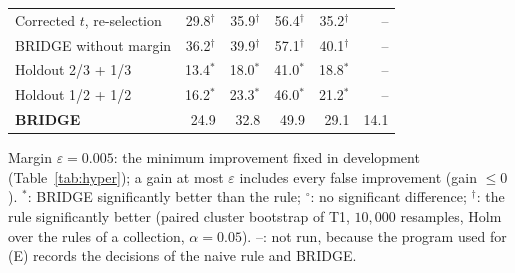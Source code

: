 \begin{table}[!t]
\begin{tabular}{@{}lrrrrr@{}}
Corrected $t$, re-selection & 29.8$^{\dagger}$ & 35.9$^{\dagger}$ & 56.4$^{\dagger}$ & 35.2$^{\dagger}$ & -- \\
BRIDGE without margin & 36.2$^{\dagger}$ & 39.9$^{\dagger}$ & 57.1$^{\dagger}$ & 40.1$^{\dagger}$ & -- \\
Holdout 2/3 + 1/3 & 13.4$^{*}$ & 18.0$^{*}$ & 41.0$^{*}$ & 18.8$^{*}$ & -- \\
Holdout 1/2 + 1/2 & 16.2$^{*}$ & 23.3$^{*}$ & 46.0$^{*}$ & 21.2$^{*}$ & -- \\
\textbf{BRIDGE} & 24.9 & 32.8 & 49.9 & 29.1 & 14.1 \\
\bottomrule
\end{tabular}

\vspace{2pt}
\parbox{\linewidth}{\justifying\scriptsize Margin $\varepsilon=0.005$: the minimum improvement fixed in development (Table~\ref{tab:hyper}); a gain at most $\varepsilon$ includes every false improvement (gain $\le 0$). $^{*}$: BRIDGE significantly better than the rule; $^{\circ}$: no significant difference; $^{\dagger}$: the rule significantly better (paired cluster bootstrap of T1, $10{,}000$ resamples, Holm over the rules of a collection, $\alpha=0.05$). --: not run, because the program used for (E) records the decisions of the naive rule and BRIDGE.}
\end{table}
